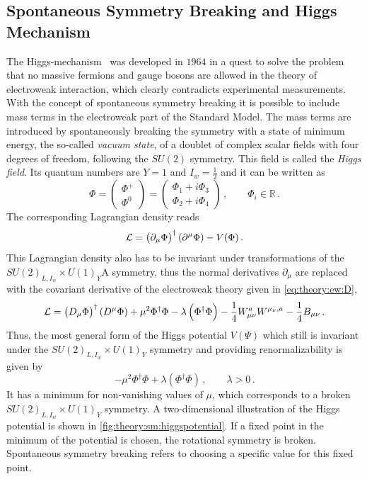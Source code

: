 \subsection{Spontaneous Symmetry Breaking and Higgs Mechanism}\label{sub:theory:sm:higgsmechanism}

The Higgs-mechanism~\cite{HiggsMecha1,HiggsMecha2,HiggsMecha3,HiggsMecha4,HiggsMecha5,HiggsMecha6} was
developed in $1964$ in a quest to solve the problem that no massive fermions and gauge bosons are allowed
in the theory of electroweak interaction, which clearly contradicts experimental measurements.
With the concept of spontaneous symmetry breaking it is possible to include mass terms in the electroweak part of the Standard Model.
The mass terms are introduced by spontaneously breaking the symmetry with a state of minimum energy, the so-called \emph{vacuum state},
of a doublet of complex scalar fields with four degrees of freedom, following the $SU(2)$ symmetry.
This field is called the \emph{Higgs field}.
Its quantum numbers are $Y = 1$ and $I_w = \frac{1}{2}$ and it can be written as~\cite{Schmuser}
\begin{equation}
    \Phi =
    \begin{pmatrix}
        \Phi^+ \\ \Phi^0
    \end{pmatrix}
    =
    \begin{pmatrix}
        \Phi_1 + i \Phi_3 \\
        \Phi_2 + i \Phi_4
    \end{pmatrix} \,, \qquad \Phi_i \in \mathbb{R} \,.
\end{equation}
The corresponding Lagrangian density reads
\begin{equation}
    \mathcal{L} = {\left(\partial_\mu\Phi\right)}^\dagger \left(\partial^\mu\Phi\right) - V(\Phi) \,.
\end{equation}
This Lagrangian density also has to be invariant under transformations of the $SU{(2)}_{L,I_w} \times U{(1)}_Y$A symmetry,
thus the normal derivatives $\partial_\mu$ are replaced with the covariant derivative of the electroweak theory given in \cref{eq:theory:ew:D},
\begin{equation}
    \mathcal{L} = {\left(D_\mu\Phi\right)}^\dagger \left(D^\mu\Phi\right) + \mu^2 \Phi^\dagger \Phi - \lambda \left(\Phi^\dagger \Phi\right) - \frac{1}{4} W_{\mu\nu}^a W^{\mu_\nu,a} - \frac{1}{4} B_{\mu\nu} \,.
\end{equation}
Thus, the most general form of the Higgs potential $V(\Psi)$ which still is invariant under the $SU{(2)}_{L,I_w} \times U{(1)}_Y$ symmetry and providing renormalizability
is given by
\begin{equation}
    - \mu^2 \Phi^\dagger \Phi + \lambda \left(\Phi^\dagger \Phi\right) \,, \qquad \lambda > 0 \,.
\end{equation}
It has a minimum for non-vanishing values of $\mu$, which corresponds to a broken $SU{(2)}_{L,I_w} \times U{(1)}_Y$ symmetry.
A two-dimensional illustration of the Higgs potential is shown in \cref{fig:theory:sm:higgspotential}.
If a fixed point in the minimum of the potential is chosen, the rotational symmetry is broken.
Spontaneous symmetry breaking refers to choosing a specific value for this fixed point.

